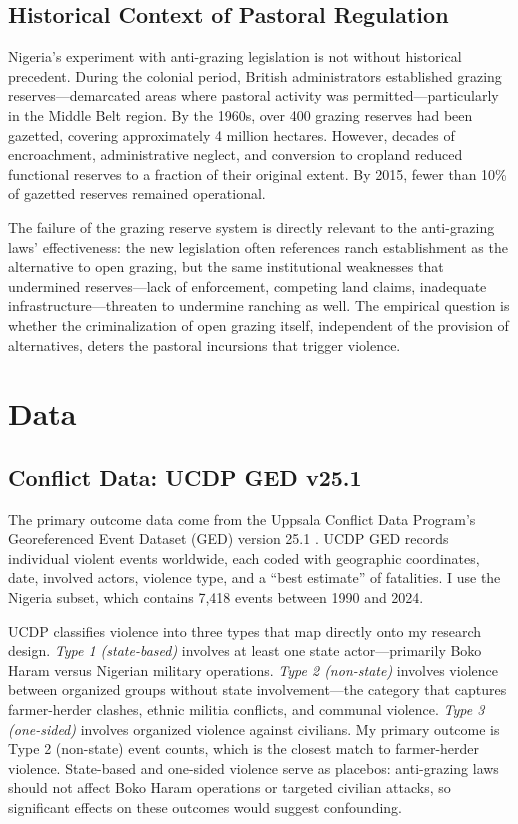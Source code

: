 \documentclass[12pt]{article}
\begin{document}
\subsection{Historical Context of Pastoral Regulation}

Nigeria's experiment with anti-grazing legislation is not without historical precedent. During the colonial period, British administrators established grazing reserves---demarcated areas where pastoral activity was permitted---particularly in the Middle Belt region. By the 1960s, over 400 grazing reserves had been gazetted, covering approximately 4 million hectares. However, decades of encroachment, administrative neglect, and conversion to cropland reduced functional reserves to a fraction of their original extent. By 2015, fewer than 10\% of gazetted reserves remained operational.

The failure of the grazing reserve system is directly relevant to the anti-grazing laws' effectiveness: the new legislation often references ranch establishment as the alternative to open grazing, but the same institutional weaknesses that undermined reserves---lack of enforcement, competing land claims, inadequate infrastructure---threaten to undermine ranching as well. The empirical question is whether the criminalization of open grazing itself, independent of the provision of alternatives, deters the pastoral incursions that trigger violence.


\section{Data}

\subsection{Conflict Data: UCDP GED v25.1}

The primary outcome data come from the Uppsala Conflict Data Program's Georeferenced Event Dataset (GED) version 25.1 \citep{sundberg2013introducing, pettersson2023organized}. UCDP GED records individual violent events worldwide, each coded with geographic coordinates, date, involved actors, violence type, and a ``best estimate'' of fatalities. I use the Nigeria subset, which contains 7,418 events between 1990 and 2024.

UCDP classifies violence into three types that map directly onto my research design. \textit{Type 1 (state-based)} involves at least one state actor---primarily Boko Haram versus Nigerian military operations. \textit{Type 2 (non-state)} involves violence between organized groups without state involvement---the category that captures farmer-herder clashes, ethnic militia conflicts, and communal violence. \textit{Type 3 (one-sided)} involves organized violence against civilians. My primary outcome is Type 2 (non-state) event counts, which is the closest match to farmer-herder violence. State-based and one-sided violence serve as placebos: anti-grazing laws should not affect Boko Haram operations or targeted civilian attacks, so significant effects on these outcomes would suggest confounding.
\end{document}
